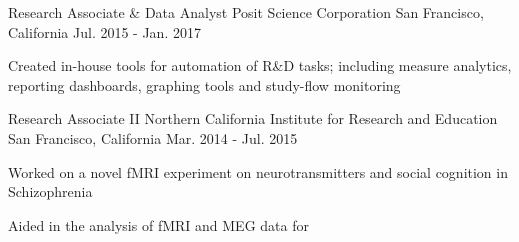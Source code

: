 \documentclass[../omelveny-cv]{subfiles}
\begin{document}
\begin{cventries}
    \cventry
    {Research Associate \& Data Analyst}
    {Posit Science Corporation}
    {San Francisco, California}
    {Jul. 2015 - Jan. 2017}
    {
        \begin{cvitems}
            \item {Created in-house tools for automation of R\&D tasks; including measure analytics, reporting dashboards, graphing tools and study-flow monitoring}
        \end{cvitems}
    }

    \cventry
    {Research Associate II}
    {Northern California Institute for Research and Education}
    {San Francisco, California}
    {Mar. 2014 - Jul. 2015}
    {
        \begin{cvitems}
            \item {Worked on a novel fMRI experiment on neurotransmitters and social cognition in Schizophrenia}
            \item {Aided in the analysis of fMRI and MEG data for}
        \end{cvitems}
    }


\end{cventries}
\end{document}

